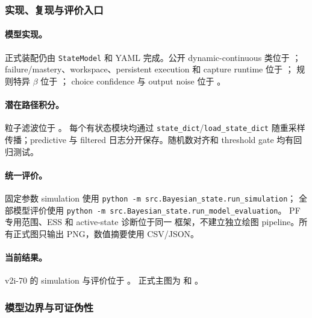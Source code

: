 \subsubsection{实现、复现与评价入口}

\paragraph{模型实现。}
正式装配仍由 \texttt{StateModel} 和 YAML 完成。公开 dynamic-continuous 类位于
；
failure/mastery、workspace、persistent execution 和 capture runtime 位于
；
规则特异 $\beta$ 位于
；
choice confidence 与 output noise 位于
。

\paragraph{潜在路径积分。}
粒子滤波位于
。
每个有状态模块均通过
\texttt{state\_dict}/\texttt{load\_state\_dict} 随重采样传播；predictive 与 filtered 日志分开保存。随机数对齐和 threshold gate 均有回归测试。

\paragraph{统一评价。}
固定参数 simulation 使用
\texttt{python -m src.Bayesian\_state.run\_simulation}；
全部模型评价使用
\texttt{python -m src.Bayesian\_state.run\_model\_evaluation}。
PF 专用范围、ESS 和 active-state 诊断位于同一
 框架，不建立独立绘图 pipeline。所有正式图只输出 PNG，数值摘要使用 CSV/JSON。

\paragraph{当前结果。}
v2i-70 的 simulation 与评价位于
。
正式主图为
和
。


\subsubsection{模型边界与可证伪性}

